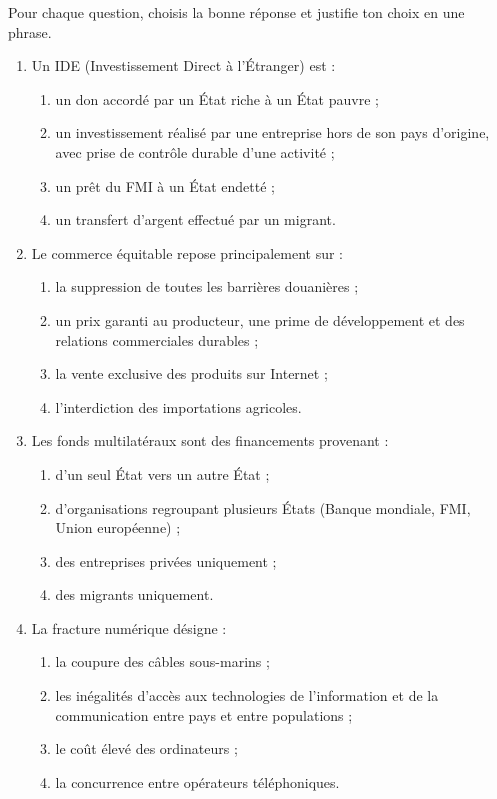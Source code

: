 \documentclass[11pt]{article}
\newcommand{\cle}[1]{{\popxbold\color{popdark}#1}}
\begin{document}
\begin{exercice}
Pour chaque question, choisis la bonne réponse et justifie ton choix en une phrase.
\begin{enumerate}
\item Un \cle{IDE} (Investissement Direct à l'Étranger) est :
\begin{enumerate}
\item un don accordé par un État riche à un État pauvre ;
\item un investissement réalisé par une entreprise hors de son pays d'origine, avec prise de contrôle durable d'une activité ;
\item un prêt du FMI à un État endetté ;
\item un transfert d'argent effectué par un migrant.
\end{enumerate}
\item Le \cle{commerce équitable} repose principalement sur :
\begin{enumerate}
\item la suppression de toutes les barrières douanières ;
\item un prix garanti au producteur, une prime de développement et des relations commerciales durables ;
\item la vente exclusive des produits sur Internet ;
\item l'interdiction des importations agricoles.
\end{enumerate}
\item Les \cle{fonds multilatéraux} sont des financements provenant :
\begin{enumerate}
\item d'un seul État vers un autre État ;
\item d'organisations regroupant plusieurs États (Banque mondiale, FMI, Union européenne) ;
\item des entreprises privées uniquement ;
\item des migrants uniquement.
\end{enumerate}
\item La \cle{fracture numérique} désigne :
\begin{enumerate}
\item la coupure des câbles sous-marins ;
\item les inégalités d'accès aux technologies de l'information et de la communication entre pays et entre populations ;
\item le coût élevé des ordinateurs ;
\item la concurrence entre opérateurs téléphoniques.
\end{enumerate}
\end{enumerate}
\end{exercice}
\end{document}
